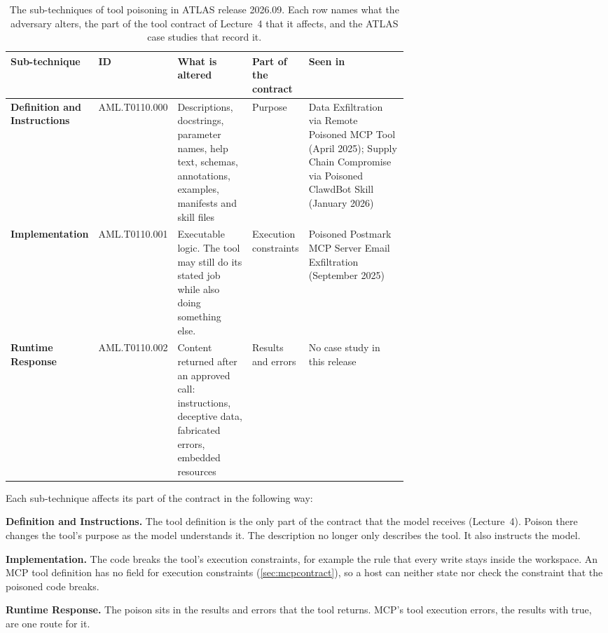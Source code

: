 \begin{table}[tb]
  \caption{The sub-techniques of tool poisoning in ATLAS release 2026.09. Each row names what the
  adversary alters, the part of the tool contract of Lecture~4 that it affects, and the ATLAS case
  studies that record it.}
  \label{tab:attacks-subtechniques}
  \begin{adjustbox}{width=\linewidth}\begin{tabularx}{\linewidth}{L{0.15\linewidth}L{0.125\linewidth}XL{0.13\linewidth}L{0.25\linewidth}}
    \toprule
    \textbf{Sub-technique} & \textbf{ID} & \textbf{What is altered} & \textbf{Part of the contract} & \textbf{Seen in} \\
    \midrule
    \textbf{Definition and Instructions} & AML.T0110.000 & Descriptions, docstrings, parameter names,
    help text, schemas, annotations, examples, manifests and skill files & Purpose & Data Exfiltration via Remote Poisoned MCP Tool (April 2025); Supply Chain Compromise via
    Poisoned ClawdBot Skill (January 2026) \\
    \textbf{Implementation} & AML.T0110.001 & Executable logic. The tool may still do its stated job
    while also doing something else. & Execution constraints & Poisoned Postmark MCP Server Email
    Exfiltration (September 2025) \\
    \textbf{Runtime Response} & AML.T0110.002 & Content returned after an approved call:
    instructions, deceptive data, fabricated errors, embedded resources & Results and errors & No
    case study in this release \\
    \bottomrule
  \end{tabularx}\end{adjustbox}
\end{table}

Each sub-technique affects its part of the contract in the following way:
\bi
\item \textbf{Definition and Instructions.} The tool definition is the only part of the contract
that the model receives (Lecture~4). Poison there changes the tool's purpose as the model
understands it. The description no longer only describes the tool. It also instructs the model.
\item \textbf{Implementation.} The code breaks the tool's execution constraints, for example the
rule that every write stays inside the workspace. An MCP tool definition has no field for execution
constraints (\cref{sec:mcpcontract}), so a host can neither state nor check the constraint that the
poisoned code breaks.
\item \textbf{Runtime Response.} The poison sits in the results and errors that the tool returns.
MCP's tool execution errors, the results with  true, are one route for it.
\ei

